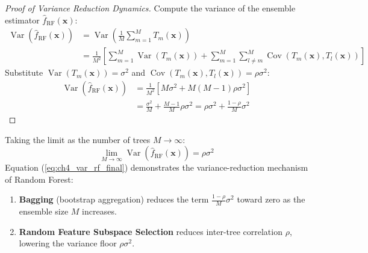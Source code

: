 \begin{proof}[Proof of Variance Reduction Dynamics]
Compute the variance of the ensemble estimator $\hat{f}_{\text{RF}}(\mathbf{x})$:
\begin{align}
\operatorname{Var}\left( \hat{f}_{\text{RF}}(\mathbf{x}) \right) &= \operatorname{Var}\left( \frac{1}{M} \sum_{m=1}^M T_m(\mathbf{x}) \right) \\
&= \frac{1}{M^2} \left[ \sum_{m=1}^M \operatorname{Var}(T_m(\mathbf{x})) + \sum_{m=1}^M \sum_{l \neq m}^M \operatorname{Cov}(T_m(\mathbf{x}), T_l(\mathbf{x})) \right]
\label{eq:ch4_var_rf_expansion}
\end{align}
Substitute $\operatorname{Var}(T_m(\mathbf{x})) = \sigma^2$ and $\operatorname{Cov}(T_m(\mathbf{x}), T_l(\mathbf{x})) = \rho \sigma^2$:
\begin{align}
\operatorname{Var}\left( \hat{f}_{\text{RF}}(\mathbf{x}) \right) &= \frac{1}{M^2} \left[ M \sigma^2 + M(M-1) \rho \sigma^2 \right] \\
&= \frac{\sigma^2}{M} + \frac{M-1}{M} \rho \sigma^2 = \rho \sigma^2 + \frac{1 - \rho}{M} \sigma^2
\label{eq:ch4_var_rf_final}
\end{align}
\end{proof}

Taking the limit as the number of trees $M \to \infty$:
\begin{equation}
\lim_{M \to \infty} \operatorname{Var}\left( \hat{f}_{\text{RF}}(\mathbf{x}) \right) = \rho \sigma^2
\end{equation}
Equation (\ref{eq:ch4_var_rf_final}) demonstrates the variance-reduction mechanism of Random Forest:
\begin{enumerate}
    \item \textbf{Bagging} (bootstrap aggregation) reduces the term $\frac{1-\rho}{M} \sigma^2$ toward zero as the ensemble size $M$ increases.
    \item \textbf{Random Feature Subspace Selection} reduces inter-tree correlation $\rho$, lowering the variance floor $\rho \sigma^2$.
\end{enumerate}

